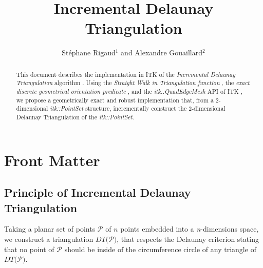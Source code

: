 \documentclass{InsightArticle}
\title{Incremental Delaunay Triangulation}
\author{St\'{e}phane Rigaud$^{1}$ and Alexandre Gouaillard$^{2}$}
\newcommand{\IJhandlerIDnumber}{1338}  %
\begin{document}
%
% 
\IJhandlefooter{\IJhandlerIDnumber}


\ifpdf
\else
\fi


\maketitle


\ifhtml
\chapter*{Front Matter\label{front}}
\fi


\begin{abstract}
\noindent
This document describes the implementation in ITK of the \emph{Incremental Delaunay Triangulation} algorithm \cite{Devillers1998}. Using the \emph{Straight Walk in Triangulation function} \cite{Rigaud2012}, the \emph{exact discrete geometrical orientation predicate} \cite{Moreau2011},  and the \emph{itk::QuadEdgeMesh} API \cite{Gouaillard2006} of ITK , we propose a geometrically exact and robust implementation that, from a 2-dimensional \emph{itk::PointSet} structure, incrementally construct the 2-dimensional Delaunay Triangulation of the \emph{itk::PointSet}.

\end{abstract}

\IJhandlenote{\IJhandlerIDnumber}

\tableofcontents
\vfil
\section{Principle of Incremental Delaunay Triangulation}

Taking a planar set of points $\mathcal{P}$ of $\mathit{n}$ points embedded into a \emph{n}-dimensions space, we construct a triangulation $\mathit{DT(}\mathcal{P}\mathit{)}$, that respects the Delaunay criterion stating that no point of $\mathcal{P}$ should be inside of the circumference circle of any triangle of $\mathit{DT(}\mathcal{P}\mathit{)}$.\\
\end{document}
